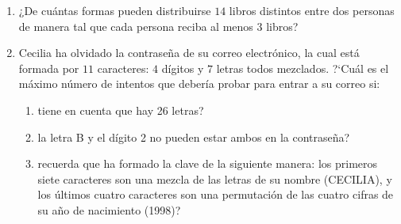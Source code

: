 \documentclass[12pt,spanish,makeidx]{amsbook}
\begin{document}
\begin {enumerate}
\smallskip

\item ¿De cuántas formas pueden distribuirse $14$ libros distintos entre dos
personas de manera tal que cada persona reciba al menos $3$ libros?

\smallskip

\item
Cecilia ha olvidado la contraseña de su correo electrónico, la cual est\'a formada por $11$ caracteres: $4$ d\'igitos y $7$ letras todos mezclados. ?`Cu\'al es el m\'aximo n\'umero de intentos que deber\'ia probar para entrar a su correo si:
\begin{enumerate}
	\item  tiene en cuenta que hay 26 letras?
	
	\item la letra B y el d\'igito 2 no pueden estar ambos en la contraseña?
	
	\item  recuerda que ha formado la clave de la siguiente manera: los primeros siete caracteres son una mezcla de las letras de su nombre (CECILIA), y los \'ultimos cuatro caracteres son una permutaci\'on de las cuatro cifras de su a\~no de nacimiento (1998)?
\end{enumerate}


\end{enumerate}
\end{document}
